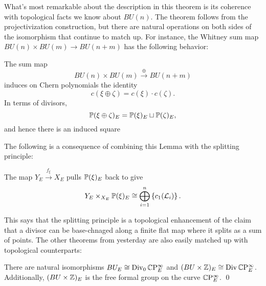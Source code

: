 What's most remarkable about the description in this theorem is its coherence with topological facts we know about $BU(n)$.  The theorem follows from the projectivization construction, but there are natural operations on both sides of the isomorphism that continue to match up.  For instance, the Whitney sum map $BU(n) \times BU(m) \to BU(n+m)$ has the following behavior:

\begin{lemma}\label{WhitneySumOfDivisors}
The sum map \[BU(n) \times BU(m) \xrightarrow\oplus BU(n+m)\] induces on Chern polynomials the identity \[c(\xi \oplus \zeta) = c(\xi) \cdot c(\zeta).\]  In terms of divisors, \[\P(\xi \oplus \zeta)_E = \P(\xi)_E \sqcup \P(\zeta)_E,\] and hence there is an induced square
\begin{center}
\end{center}
\end{lemma}

The following is a consequence of combining this Lemma with the splitting principle:

\begin{corollary}
The map $Y_E \xrightarrow{f_\xi} X_E$ pulls $\P(\xi)_E$ back to give \[Y_E \times_{X_E} \P(\xi)_E \cong \bigoplus_{i=1}^n \left\{ c_1(\L_i) \right\}. \qed\]
\end{corollary}

\noindent This says that the splitting principle is a topological enhancement of the claim that a divisor can be base-chnaged along a finite flat map where it splits as a sum of points.  The other theorems from yesterday are also easily matched up with topological counterparts:

\begin{corollary}
There are natural isomorphisms $BU_E \cong \Div_0 \CP^\infty_E$ and $(BU \times \Z)_E \cong \Div \CP^\infty_E$. Additionally, $(BU \times \Z)_E$ is the free formal group on the curve $\CP^\infty_E$. \qed
\end{corollary}

